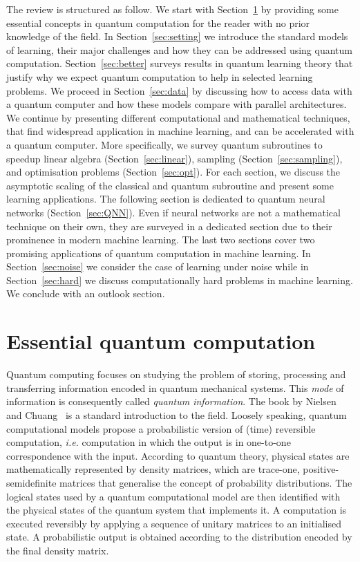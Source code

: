 \documentclass[a4paper, 11pt]{article}
\begin{document}
The review is structured as follow. We start with Section~\ref{sec:essential} by providing some essential concepts in quantum computation for the reader with no prior knowledge of the field. In Section~\ref{sec:setting} we introduce the standard models of learning, their major challenges and how they can be addressed using quantum computation. Section~\ref{sec:better} surveys results in quantum learning theory that justify why we expect quantum computation to help in selected learning problems. We proceed in Section~\ref{sec:data} by discussing how to access data with a quantum computer and how these models compare with parallel architectures. We continue by presenting different computational and mathematical techniques, that find widespread application in machine learning, and can be accelerated with a quantum computer. More specifically, we survey quantum subroutines to speedup linear algebra (Section~\ref{sec:linear}), sampling (Section~\ref{sec:sampling}), and optimisation problems (Section~\ref{sec:opt}). For each section, we discuss the asymptotic scaling of the classical and quantum subroutine and present some learning applications. The following section is dedicated to quantum neural networks (Section~\ref{sec:QNN}). Even if neural networks are not a mathematical technique on their own, they are surveyed in a dedicated section due to their prominence in modern machine learning. The last two sections cover two promising applications of quantum computation in machine learning. In Section~\ref{sec:noise} we consider the case of learning under noise while in Section~\ref{sec:hard} we discuss computationally hard problems in machine learning. We conclude with an outlook section.

\section{Essential quantum computation}
\label{sec:essential}

Quantum computing focuses on studying the problem of storing, processing and transferring information encoded in quantum mechanical systems. This \emph{mode} of information is consequently called \emph{quantum information}. The book by Nielsen and Chuang~\cite{nielsen2010quantum} is a standard introduction to the field. Loosely speaking, quantum computational models propose a probabilistic version of (time) reversible computation, \textit{i.e.} computation in which the output is in one-to-one correspondence with the input. According to quantum theory, physical states are mathematically represented by density matrices, which are trace-one, positive-semidefinite matrices that generalise the concept of probability distributions. The logical states used by a quantum computational model are then identified with the physical states of the quantum system that implements it.  A computation is executed reversibly by applying a sequence of unitary matrices to an initialised state. A probabilistic output is obtained according to the distribution encoded by the final density matrix.\\
\end{document}
